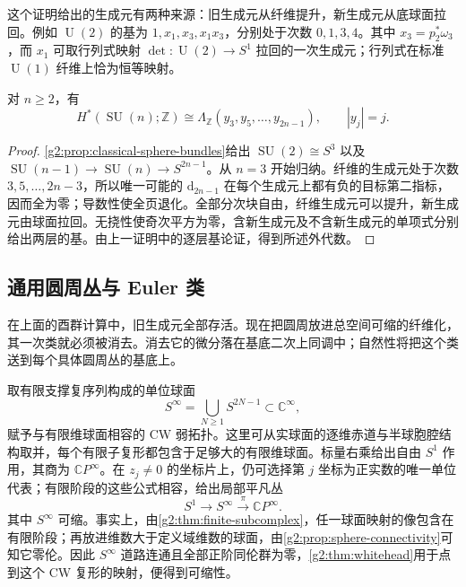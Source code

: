这个证明给出的生成元有两种来源：旧生成元从纤维提升，新生成元从底球面拉回。例如 \(\operatorname{U}(2)\) 的基为 \(1,x_1,x_3,x_1x_3\)，分别处于次数 \(0,1,3,4\)。其中 \(x_3=p_2^*\omega_3\)，而 \(x_1\) 可取行列式映射 \(\det:\operatorname{U}(2)\rightarrow S^1\) 拉回的一次生成元；行列式在标准 \(\operatorname{U}(1)\) 纤维上恰为恒等映射。

\begin{corollary}\label{g2:cor:special-unitary-cohomology}
	对 \(n\ge2\)，有
	\[
		H^*(\operatorname{SU}(n);\mathbb Z)\cong\Lambda_{\mathbb Z}(y_3,y_5,\ldots,y_{2n-1}),\qquad |y_j|=j.
	\]
\end{corollary}
\begin{proof}
	\cref{g2:prop:classical-sphere-bundles}给出 \(\operatorname{SU}(2)\cong S^3\) 以及 \(\operatorname{SU}(n-1)\rightarrow\operatorname{SU}(n)\rightarrow S^{2n-1}\)。从 \(n=3\) 开始归纳。纤维的生成元处于次数 \(3,5,\ldots,2n-3\)，所以唯一可能的 \(\mathrm d_{2n-1}\) 在每个生成元上都有负的目标第二指标，因而全为零；导数性使全页退化。全部分次块自由，纤维生成元可以提升，新生成元由球面拉回。无挠性使奇次平方为零，含新生成元及不含新生成元的单项式分别给出两层的基。由上一证明中的逐层基论证，得到所述外代数。
\end{proof}

\subsection{通用圆周丛与 Euler 类}
\label{g2:subsec:1104:02}

在上面的酉群计算中，旧生成元全部存活。现在把圆周放进总空间可缩的纤维化，其一次类就必须被消去。消去它的微分落在基底二次上同调中；自然性将把这个类送到每个具体圆周丛的基底上。

\ProseParagraphBreak

取有限支撑复序列构成的单位球面
\[
	S^\infty=\bigcup_{N\ge1}S^{2N-1}\subset\mathbb C^\infty,
\]
赋予与有限维球面相容的 CW 弱拓扑。这里可从实球面的逐维赤道与半球胞腔结构取并，每个有限子复形都包含于足够大的有限维球面。标量右乘给出自由 \(S^1\) 作用，其商为 \(\mathbb CP^\infty\)。在 \(z_j\ne0\) 的坐标片上，仍可选择第 \(j\) 坐标为正实数的唯一单位代表；有限阶段的这些公式相容，给出局部平凡丛
\begin{equation}\label{g2:eq:universal-circle-bundle}
	S^1\longrightarrow S^\infty\xrightarrow{\pi}\mathbb CP^\infty.
\end{equation}
其中 \(S^\infty\) 可缩。事实上，由\cref{g2:thm:finite-subcomplex}，任一球面映射的像包含在有限阶段；再放进维数大于定义域维数的球面，由\cref{g2:prop:sphere-connectivity}可知它零伦。因此 \(S^\infty\) 道路连通且全部正阶同伦群为零，\cref{g2:thm:whitehead}用于点到这个 CW 复形的映射，便得到可缩性。

